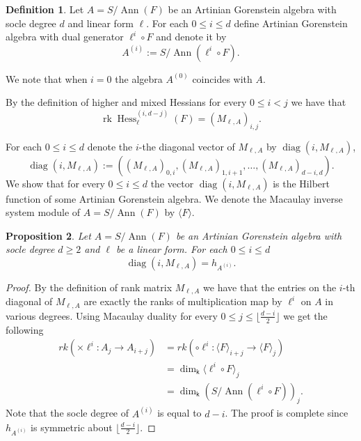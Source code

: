 \documentclass[12pt]{amsart}
\numberwithin{equation}{section}
\theoremstyle{plain} \newtheorem{theorem}{Theorem}[section]
\newtheorem{proposition}[theorem]{Proposition} \newtheorem{lemma}[theorem]{Lemma}
\theoremstyle{definition} \newtheorem{definition}[theorem]{Definition}
\DeclareMathOperator{\Hess}{Hess}\DeclareMathOperator{\rk}{rk}
\DeclareMathOperator{\ann}{Ann}\DeclareMathOperator{\Char}{char}
\DeclareMathOperator{\K}{\mathsf{k}}
\DeclareMathOperator{\diag}{\mathrm{diag}}
\begin{document}
\begin{definition}
Let $A=S/\ann(F)$  be an Artinian    Gorenstein algebra  with socle degree $d$ and linear form $\ell$. For each $0\leq i\leq d$ define Artinian Gorenstein algebra with dual generator $\ell^i\circ F$ and denote it by
$$
A^{(i)} := S/\ann(\ell^i\circ F).
$$
\end{definition}
\noindent We note that when $i=0$ the algebra $A^{(0)}$ coincides with $A$. \par
\noindent 
\begin{remark}\label{r_ij-remark}
By the definition of higher and mixed Hessians for every $0\leq i<j$ we have that 
\begin{equation}
\rk \Hess^{(i,d-j)}_\ell (F) = (M_{\ell,A})_{i,j}.
\end{equation}
\end{remark} 
For each $0\leq i\leq d$ denote the $i$-the diagonal vector of $M_{\ell,A}$ by $\diag(i,M_{\ell,A})$,
$$\diag(i,M_{\ell,A}):=((M_{\ell,A})_{0,i},(M_{\ell,A})_{1,i+1},\dots ,(M_{\ell,A})_{d-i,d}).$$
We show that for every $0\leq i\leq d$ the vector $\diag(i,M_{\ell,A})$ is the Hilbert function of some Artinian    Gorenstein algebra.
We denote the Macaulay inverse system module of $A=S/\ann(F)$ by $\langle F\rangle$.
\begin{proposition}\label{diagprop}
Let $A=S/\ann(F)$ be an Artinian    Gorenstein algebra with socle degree $d\geq 2$ and $\ell$ be a linear form. For each $0\leq i\leq d$
$$
\diag(i,M_{\ell,A}) = h_{A^{(i)}}.
$$
\end{proposition}
\begin{proof}
By the definition of rank matrix $M_{\ell,A}$ we have that the entries on the $i$-th diagonal of $M_{\ell,A}$ are exactly the ranks of multiplication map by $\ell^i$ on $A$ in various degrees.
Using Macaulay duality for every $0\leq j\leq \lfloor\frac{d-i}{2}\rfloor$ we get the following 
\begin{align*}
rk\left(\times \ell^{i} : A_j\longrightarrow A_{i+j}\right)&=rk\left(\circ \ell^{i} : \langle F\rangle_{i+j}\longrightarrow \langle F\rangle_{j}\right)\\&=\dim_{\K} \langle \ell^i\circ F \rangle_j\\
&=\dim_{\K}(S/\ann(\ell^i\circ F))_{j}.
\end{align*}%
Note that the socle degree of $A^{(i)}$ is equal to $d-i$. The proof is complete since $h_{A^{(i)}}$ is symmetric about $\lfloor\frac{d-i}{2}\rfloor$.
\end{proof}
\end{document}

